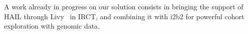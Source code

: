 A work already in progress on our solution consists in bringing the support of HAIL through Livy~\cite{livy} in IRCT, and combining it with i2b2 for powerful cohort exploration with genomic data.






% 
